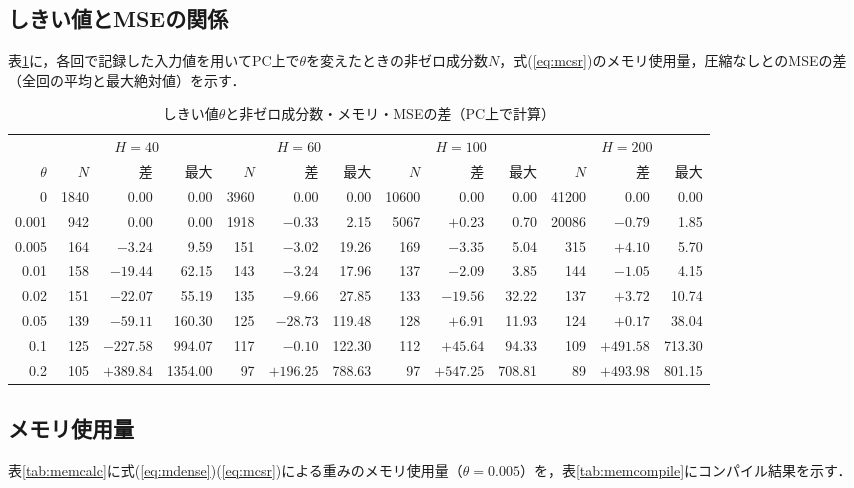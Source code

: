 \documentclass[a4paper,11pt,uplatex,dvipdfmx]{jsarticle}
\begin{document}
\subsection{しきい値とMSEの関係}
表\ref{tab:sweep}に，各回で記録した入力値を用いてPC上で$\theta$を変えたときの非ゼロ成分数$N$，式(\ref{eq:mcsr})のメモリ使用量，圧縮なしとのMSEの差（全回の平均と最大絶対値）を示す．

\begin{table}[H]
  \centering
  \caption{しきい値$\theta$と非ゼロ成分数・メモリ・MSEの差（PC上で計算）}
  \label{tab:sweep}
  \footnotesize\setlength{\tabcolsep}{3.5pt}
  \begin{tabular}{r|rrr|rrr|rrr|rrr}
    \toprule
     & \multicolumn{3}{c|}{$H=40$} & \multicolumn{3}{c|}{$H=60$} & \multicolumn{3}{c|}{$H=100$} & \multicolumn{3}{c}{$H=200$} \\
    $\theta$ & $N$ & 差 & 最大 & $N$ & 差 & 最大 & $N$ & 差 & 最大 & $N$ & 差 & 最大 \\
    \midrule
    0     & 1840 & 0.00   & 0.00   & 3960 & 0.00   & 0.00   & 10600 & 0.00   & 0.00   & 41200 & 0.00   & 0.00   \\
    0.001 &  942 & 0.00   & 0.00   & 1918 & $-0.33$ & 2.15  &  5067 & $+0.23$ & 0.70  & 20086 & $-0.79$ & 1.85  \\
    0.005 &  164 & $-3.24$ & 9.59  &  151 & $-3.02$ & 19.26 &   169 & $-3.35$ & 5.04  &   315 & $+4.10$ & 5.70  \\
    0.01  &  158 & $-19.44$ & 62.15 & 143 & $-3.24$ & 17.96 &   137 & $-2.09$ & 3.85  &   144 & $-1.05$ & 4.15  \\
    0.02  &  151 & $-22.07$ & 55.19 & 135 & $-9.66$ & 27.85 &   133 & $-19.56$ & 32.22 &  137 & $+3.72$ & 10.74 \\
    0.05  &  139 & $-59.11$ & 160.30 & 125 & $-28.73$ & 119.48 & 128 & $+6.91$ & 11.93 &  124 & $+0.17$ & 38.04 \\
    0.1   &  125 & $-227.58$ & 994.07 & 117 & $-0.10$ & 122.30 & 112 & $+45.64$ & 94.33 & 109 & $+491.58$ & 713.30 \\
    0.2   &  105 & $+389.84$ & 1354.00 & 97 & $+196.25$ & 788.63 & 97 & $+547.25$ & 708.81 & 89 & $+493.98$ & 801.15 \\
    \bottomrule
  \end{tabular}
\end{table}

\subsection{メモリ使用量}
表\ref{tab:memcalc}に式(\ref{eq:mdense})(\ref{eq:mcsr})による重みのメモリ使用量（$\theta=0.005$）を，表\ref{tab:memcompile}にコンパイル結果を示す．
\end{document}
